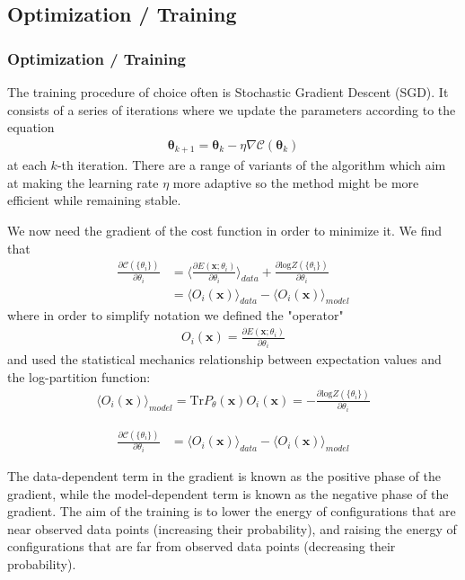\documentclass[norsk,a4paper,11pt]{beamer}
\begin{document}
\subsection{Optimization / Training}
\begin{frame}
\frametitle{Optimization / Training}
The training procedure of choice often is Stochastic Gradient Descent (SGD). It consists of a series of iterations where we update the parameters according to the equation
\begin{align}
	\bm{\theta}_{k+1} = \bm{\theta}_k - \eta \nabla \mathcal{C} (\bm{\theta}_k)
\end{align}
at each $k$-th iteration. There are a range of variants of the algorithm which aim at making the learning rate $\eta$ more adaptive so the method might be more efficient while remaining stable.
\end{frame}

\begin{frame}
We now need the gradient of the cost function in order to minimize it. We find that
\begin{align}
	\frac{\partial \mathcal{C}(\{ \theta_i\})}{\partial \theta_i}
	&= \langle \frac{\partial E(\bm{x}; \theta_i)}{\partial \theta_i} \rangle_{data}
	+ \frac{\partial \text{log} Z(\{ \theta_i\})}{\partial \theta_i} \\
	&= \langle O_i(\bm{x}) \rangle_{data} - \langle O_i(\bm{x}) \rangle_{model}
\end{align}
where in order to simplify notation we defined the "operator"
\begin{align}
	O_i(\bm{x}) = \frac{\partial E(\bm{x}; \theta_i)}{\partial \theta_i} 
\end{align}
and used the statistical mechanics relationship between expectation values and the log-partition function:
\begin{align}
	\langle O_i(\bm{x}) \rangle_{model} = \text{Tr} P_\theta(\bm{x})O_i(\bm{x}) = - \frac{\partial \text{log} Z(\{ \theta_i\})}{\partial \theta_i}
\end{align}
\end{frame}

\begin{frame}
\begin{align}
	\frac{\partial \mathcal{C}(\{ \theta_i\})}{\partial \theta_i}
	&= \langle O_i(\bm{x}) \rangle_{data} - \langle O_i(\bm{x}) \rangle_{model}
\end{align}

The data-dependent term in the gradient is known as the positive phase of the gradient, while the model-dependent term is known as the negative phase of the gradient. The aim of the training is to lower the energy of configurations that are near observed data points (increasing their probability), and raising the energy of configurations that are far from observed data points (decreasing their probability).
\end{frame}
\end{document}
